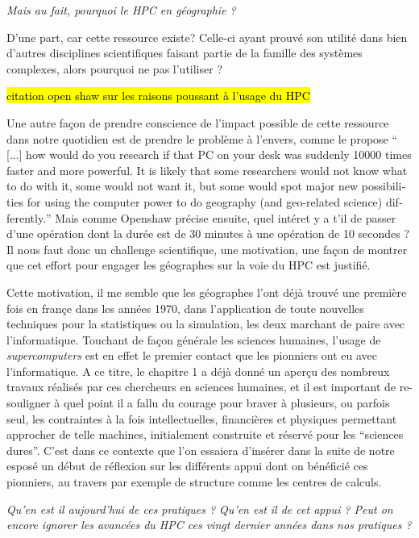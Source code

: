 \textit{Mais au fait, pourquoi le HPC en géographie ?}

D'une part, car cette ressource existe? Celle-ci ayant prouvé son utilité dans bien d'autres disciplines scientifiques faisant partie de la famille des systèmes complexes, alors pourquoi ne pas l'utiliser ? 

\hl{citation open shaw sur les raisons poussant à l'usage du HPC}

Une autre façon de prendre conscience de l'impact possible de cette ressource dans notre quotidien est de prendre le problème à l'envers, comme le propose \textcite{Openshaw2000}  \foreignquote{english}{ [...] how would do you research if that PC on your desk was suddenly 10000 times faster and more powerful. It is likely that some researchers would not know what to do with it, some would not want it, but some would spot major new possibilities for using the computer power to do geography (and geo-related science) differently.} Mais comme Openshaw précise ensuite, quel intéret y a t'il de passer d'une opération dont la durée est de 30 minutes à une opération de 10 secondes ? Il nous faut donc un challenge scientifique, une motivation, une façon de montrer que cet effort pour engager les géographes sur la voie du HPC est justifié.

Cette motivation, il me semble que les géographes l'ont déjà trouvé une première fois en françe dans les années 1970, dans l'application de toute nouvelles techniques pour la statistiques ou la simulation, les deux marchant de paire avec l'informatique. Touchant de façon générale les sciences humaines, l’usage de \textit{supercomputers} est en effet le premier contact que les pionniers ont eu avec l'informatique. A ce titre, le chapitre 1 a déjà donné un aperçu des nombreux travaux réalisés par ces chercheurs en sciences humaines, et il est important de re-souligner à quel point il a fallu du courage pour braver à plusieurs, ou parfois seul, les contraintes à la fois intellectuelles, financières et physiques permettant approcher de telle machines, initialement construite et réservé pour les \enquote{sciences dures}. C'est dans ce contexte que l'on essaiera d'insérer dans la suite de notre esposé un début de réflexion sur les différents appui dont on bénéficié ces pionniers, au travers par exemple de structure comme les centres de calculs.

\textit{Qu'en est il aujourd'hui de ces pratiques ? Qu'en est il de cet appui ? Peut on encore ignorer les avancées du HPC ces vingt dernier années dans nos pratiques ? }

